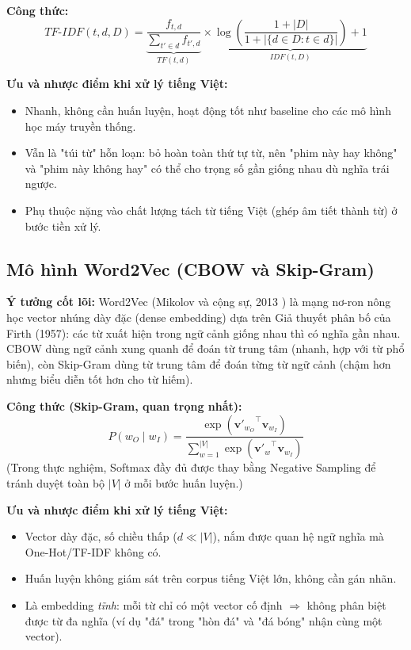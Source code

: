 \documentclass[12pt,a4paper]{article}
\begin{document}
\textbf{Công thức:}
\begin{equation}
    TF\text{-}IDF(t,d,D) = \underbrace{\frac{f_{t,d}}{\sum_{t' \in d} f_{t',d}}}_{TF(t,d)} \times \underbrace{\log\left(\frac{1+|D|}{1+|\{d \in D : t \in d\}|}\right)+1}_{IDF(t,D)}
\end{equation}

\textbf{Ưu và nhược điểm khi xử lý tiếng Việt:}
\begin{itemize}[leftmargin=1.0cm, itemsep=2pt]
    \item[+] Nhanh, không cần huấn luyện, hoạt động tốt như baseline cho các mô hình học máy truyền thống.
    \item[--] Vẫn là "túi từ" hỗn loạn: bỏ hoàn toàn thứ tự từ, nên "phim này hay không" và "phim này không hay" có thể cho trọng số gần giống nhau dù nghĩa trái ngược.
    \item[--] Phụ thuộc nặng vào chất lượng tách từ tiếng Việt (ghép âm tiết thành từ) ở bước tiền xử lý.
\end{itemize}

\subsection{Mô hình Word2Vec (CBOW và Skip-Gram)}\label{sec:word2vec}
\textbf{Ý tưởng cốt lõi:} Word2Vec (Mikolov và cộng sự, 2013 \cite{mikolov2013efficient}) là mạng nơ-ron nông học vector nhúng dày đặc (dense embedding) dựa trên Giả thuyết phân bố của Firth (1957): các từ xuất hiện trong ngữ cảnh giống nhau thì có nghĩa gần nhau. CBOW dùng ngữ cảnh xung quanh để đoán từ trung tâm (nhanh, hợp với từ phổ biến), còn Skip-Gram dùng từ trung tâm để đoán từng từ ngữ cảnh (chậm hơn nhưng biểu diễn tốt hơn cho từ hiếm).

\textbf{Công thức (Skip-Gram, quan trọng nhất):}
\begin{equation}
    P(w_O \mid w_I) = \frac{\exp\left({\mathbf{v}'_{w_O}}^\top \mathbf{v}_{w_I}\right)}{\sum_{w=1}^{|V|} \exp\left({\mathbf{v}'_w}^\top \mathbf{v}_{w_I}\right)}
\end{equation}
(Trong thực nghiệm, Softmax đầy đủ được thay bằng Negative Sampling \cite{mikolov2013distributed} để tránh duyệt toàn bộ $|V|$ ở mỗi bước huấn luyện.)

\textbf{Ưu và nhược điểm khi xử lý tiếng Việt:}
\begin{itemize}[leftmargin=1.0cm, itemsep=2pt]
    \item[+] Vector dày đặc, số chiều thấp ($d \ll |V|$), nắm được quan hệ ngữ nghĩa mà One-Hot/TF-IDF không có.
    \item[+] Huấn luyện không giám sát trên corpus tiếng Việt lớn, không cần gán nhãn.
    \item[--] Là embedding \textit{tĩnh}: mỗi từ chỉ có một vector cố định $\Rightarrow$ không phân biệt được từ đa nghĩa (ví dụ "đá" trong "hòn đá" và "đá bóng" nhận cùng một vector).
\end{itemize}
\end{document}
